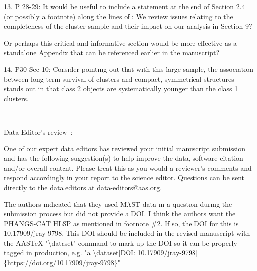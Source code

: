 13. P 28-29: It would be useful to include a statement at the end of Section 2.4 (or possibly a footnote) along the lines of : We review issues relating to the completeness of the cluster sample and their impact on our analysis in Section 9?

Or perhaps this critical and informative section would be more effective as a standalone Appendix that can be referenced earlier in the manuscript?

14. P30-Sec 10: Consider pointing out that with this large sample, the association between long-term survival of clusters and compact, symmetrical structures stands out in that class 2 objects are systematically younger than the class 1 clusters.

-----------------------

Data Editor's review :

One of our expert data editors has reviewed your initial manuscript submission and has the following suggestion(s) to help improve the data, software citation and/or overall content. Please treat this as you would a reviewer's comments and respond accordingly in your report to the science editor. Questions can be sent directly to the data editors at \href{mailto:data-editors@aas.org}{data-editors@aas.org}.

The authors indicated that they used MAST data in a question during the submission process but did not provide a DOI. I think the authors want the PHANGS-CAT HLSP as mentioned in footnote \#2. If so, the DOI for this is 10.17909/jray-9798. This DOI should be included in the revised manuscript with the AASTeX "\textbackslash{}dataset" command to mark up the DOI so it can be properly tagged in production, e.g. "a \textbackslash{}dataset[DOI: 10.17909/jray-9798]\{\href{https://urldefense.com/v3/__https://doi.org/10.17909/jray-9798__;!!CrWY41Z8OgsX0i-WU-0LuAcUu2o!x0H9flwG8xf6vpsrzrS__qjOD78S-nTxDs3LeFsBHvpsdMh0v7uanWu3OzPlbAsGTBfHkJ4MEt7RSFFpEg-31-eSaTg6$}{https://doi.org/10.17909/jray-9798}\}"
